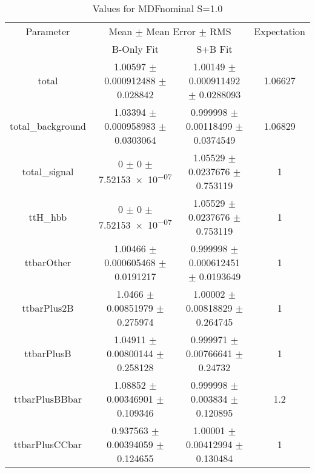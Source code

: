 \begin{table}
\centering
\caption{Values for MDFnominal S=1.0}
\begin{tabular}{cccc}
\toprule
Parameter & \multicolumn{2}{c}{Mean $\pm$ Mean Error $\pm$ RMS} & Expectation\\
 & B-Only Fit & S+B Fit & \\
\midrule
total & \num{1.00597} $\pm$ \num{0.000912488} $\pm$ \num{0.028842} & \num{1.00149} $\pm$ \num{0.000911492} $\pm$ \num{0.0288093} & \num{1.06627}\\
total\_background & \num{1.03394} $\pm$ \num{0.000958983} $\pm$ \num{0.0303064} & \num{0.999998} $\pm$ \num{0.00118499} $\pm$ \num{0.0374549} & \num{1.06829}\\
total\_signal & \num{0} $\pm$ \num{0} $\pm$ \num{7.52153e-07} & \num{1.05529} $\pm$ \num{0.0237676} $\pm$ \num{0.753119} & \num{1}\\
ttH\_hbb & \num{0} $\pm$ \num{0} $\pm$ \num{7.52153e-07} & \num{1.05529} $\pm$ \num{0.0237676} $\pm$ \num{0.753119} & \num{1}\\
ttbarOther & \num{1.00466} $\pm$ \num{0.000605468} $\pm$ \num{0.0191217} & \num{0.999998} $\pm$ \num{0.000612451} $\pm$ \num{0.0193649} & \num{1}\\
ttbarPlus2B & \num{1.0466} $\pm$ \num{0.00851979} $\pm$ \num{0.275974} & \num{1.00002} $\pm$ \num{0.00818829} $\pm$ \num{0.264745} & \num{1}\\
ttbarPlusB & \num{1.04911} $\pm$ \num{0.00800144} $\pm$ \num{0.258128} & \num{0.999971} $\pm$ \num{0.00766641} $\pm$ \num{0.24732} & \num{1}\\
ttbarPlusBBbar & \num{1.08852} $\pm$ \num{0.00346901} $\pm$ \num{0.109346} & \num{0.999998} $\pm$ \num{0.003834} $\pm$ \num{0.120895} & \num{1.2}\\
ttbarPlusCCbar & \num{0.937563} $\pm$ \num{0.00394059} $\pm$ \num{0.124655} & \num{1.00001} $\pm$ \num{0.00412994} $\pm$ \num{0.130484} & \num{1}\\
\bottomrule
\end{tabular}
\end{table}